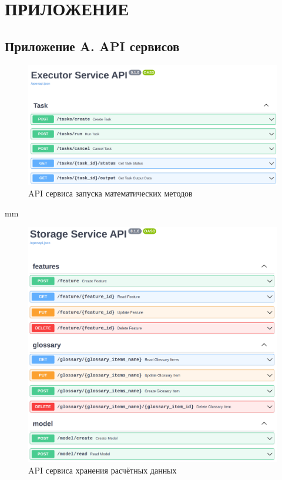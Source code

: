 \section*{\large{ПРИЛОЖЕНИЕ}}
\label{appendix}
\subsection*{\large{Приложение A. API сервисов}}
\begin{figure}[H]
	\includegraphics[width=\textwidth]{applications/pictures/executor_swagger}
	\caption{API сервиса запуска математических методов}
	\label{pic:application__executor-swagger}
\end{figure}
 mm
\begin{figure}[H]
	\includegraphics[width=\textwidth]{applications/pictures/storage_swagger}
	\caption{API сервиса хранения расчётных данных}
	\label{pic:application__storage-swagger}
\end{figure}
